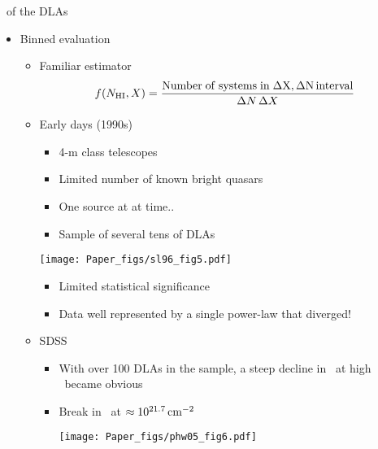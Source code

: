 \documentclass[12pt,letterpaper]{article}
\begin{document}
\begin{Aenumerate}
\begin{itemize}
\begin{itemize}
    \end{itemize}


  \end{itemize}

{\bf \item \fnhi\ of the DLAs}
  \begin{itemize}
  \item Binned evaluation
    \begin{itemize}
    \item Familiar estimator
    \begin{equation}
    f(N_{\rm HI},X) = \frac{\rm Number \; of \; systems \; in \; \Delta X, \Delta N
    \, interval}{\Delta N \, \Delta X}
    \end{equation}
    \item Early days (1990s)
      \begin{itemize}
      \item 4-m class telescopes
      \item Limited number of known bright quasars
      \item One source at at time..
      \item Sample of several tens of DLAs
      \end{itemize}

  \texttt{[image: Paper\_figs/sl96\_fig5.pdf]}

      \begin{itemize}
      \item Limited statistical significance
      \item Data well represented by a single power-law that diverged!
      \end{itemize}
    \item SDSS
      \begin{itemize}
      \item With over 100 DLAs in the sample, a steep decline
      in \fnhi\ at high \nhi\ became obvious
      \item Break in \fnhi\ at $\approx 10^{21.7} \, {\rm cm^{-2}}$

  \texttt{[image: Paper\_figs/phw05\_fig6.pdf]}

      \end{itemize}
    \end{itemize}


\end{itemize}
\end{Aenumerate}
\end{document}
